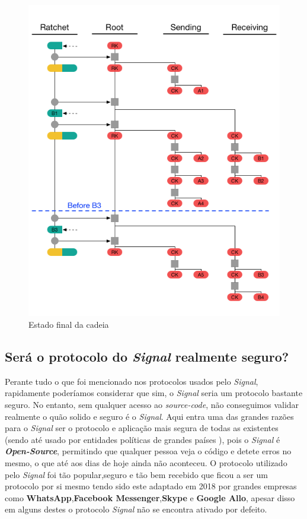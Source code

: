 \begin{figure}[H]
\begin{center}
\includegraphics[width=12cm]{img/DR5.png}
\caption{Estado final da cadeia}
\label{diagram:DR5} 
\centering
\end{center}
\end{figure}

\subsection{Será o protocolo do \textit{Signal} realmente seguro?}
Perante tudo o que foi mencionado nos protocolos usados pelo \textit{Signal}, rapidamente poderíamos considerar que sim, o \textit{Signal} seria um protocolo bastante seguro. No entanto, sem qualquer acesso ao \textit{source-code}, não conseguimos validar realmente o quão solido e seguro é o \textit{Signal}. Aqui entra uma das grandes razões para o \textit{Signal} ser o protocolo e aplicação mais segura de todas as existentes (sendo até usado por entidades políticas de grandes países \cite{politicsSignal}), pois o \textit{Signal} é \textbf{\textit{Open-Source}}, permitindo que qualquer pessoa veja o código e detete erros no mesmo, o que até aos dias de hoje ainda não aconteceu. O protocolo utilizado pelo \textit{Signal} foi tão popular,seguro e tão bem recebido que ficou a ser um protocolo por si mesmo tendo sido este adaptado em 2018 por grandes empresas como \textbf{WhatsApp},\textbf{Facebook Messenger},\textbf{Skype} e \textbf{Google Allo}, apesar disso em alguns destes o protocolo \textit{Signal} não se encontra ativado por defeito.

